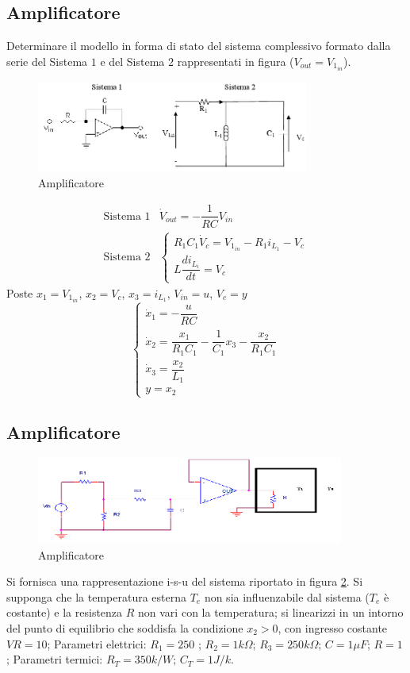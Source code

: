 \documentclass[a4paper]{report}
\begin{document}
\subsection{Amplificatore}
Determinare il modello in forma di stato del sistema complessivo
formato dalla serie del Sistema $1$ e del Sistema $2$ rappresentati in
figura ($V_{out}=V_{1_{in}}$).
\begin{figure}[!t]
\centering
\includegraphics[width=0.8\textwidth]{./images/esempio07.png}
\caption{Amplificatore\label{fig:esempio07}}
\end{figure}
\[
  \begin{array}{ll}
    \textrm{Sistema 1} & \dot{V}_{out} = - \dfrac{1}{RC} V_{in}\\
    \textrm{Sistema 2} & \left\{
            \begin{array}{l}
              R_1C_1\dot{V}_c = V_{1_{in}} - R_1 i_{L_{1}} - V_c\\
              L \dfrac{d i_{L_{i}}}{dt} = V_c
            \end{array} \right .
  \end{array}
\]
Poste $x_1 = V_{1_{in}}$, $x_2 = V_c$, $x_3 = i_{L_{1}}$, $V_{in} =
u$, $V_c = y$
\[
  \left\{
  \begin{array}{l}
    \dot{x}_1 = - \dfrac{u}{RC}\\
    \dot{x}_2 = \dfrac{x_1}{R_1 C_1} - \dfrac{1}{C_1}x_3 -
    \dfrac{x_2}{R_1 C_1}\\
    \dot{x}_3 = \dfrac{x_2}{L_1}\\
    y = x_2
  \end{array}
  \right .
\]

\subsection{Amplificatore}
\begin{figure}[!b]
  \centering
  \includegraphics[width=0.9\textwidth]{./images/esempio08.png}
  \caption{Amplificatore\label{fig:esempio08}}
\end{figure}
Si fornisca una rappresentazione i-s-u del sistema riportato in figura
\ref{fig:esempio08}. Si supponga che la temperatura esterna $T_e$ non
sia influenzabile dal sistema ($T_e$ \`e costante) e la resistenza $R$
non vari con la temperatura; si linearizzi in un intorno del punto di
equilibrio che soddisfa la condizione $x_2>0$, con ingresso costante $VR=10$;
Parametri elettrici: $R_1=250$ ; $R_2=1k\Omega$; $R_3=250k\Omega$;
$C=1 \mu F$; $R=1$ ; Parametri termici: $R_T=350 k/W$; $C_T=1 J/k$.
\end{document}
